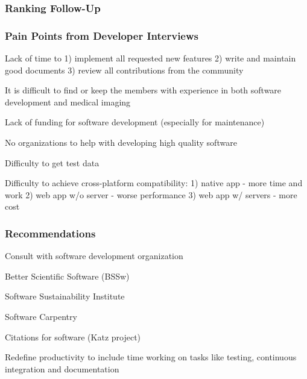\documentclass[t,12pt,numbers,fleqn]{beamer}
\begin{document}

\begin{frame}
\frametitle{Ranking Follow-Up}

\bi
\item {}
\item {}
\item {}
\ei

\end{frame}


\begin{frame}
\frametitle{Pain Points from Developer Interviews}

\bi
\item Lack of time to 1) implement all requested new features 2) write and maintain good documents 3) review all contributions from the community
\item It is difficult to find or keep the members with experience in both software development and medical imaging
\item Lack of funding for software development (especially for maintenance)
\item No organizations to help with developing high quality software
\item Difficulty to get test data
\item Difficulty to achieve cross-platform compatibility: 1) native app - more time and work 2) web app w/o server - worse performance 3) web app w/ servers - more cost
\ei

\end{frame}


\begin{frame}
\frametitle{Recommendations}

\bi
\item Consult with software development organization
  \bi
\item Better Scientific Software (BSSw)
\item Software Sustainability Institute
\item Software Carpentry
  \ei
\item Citations for software (Katz project)
  \item Redefine productivity to include time working on tasks like testing, continuous
    integration and documentation
\ei

\end{frame}
\end{document}
